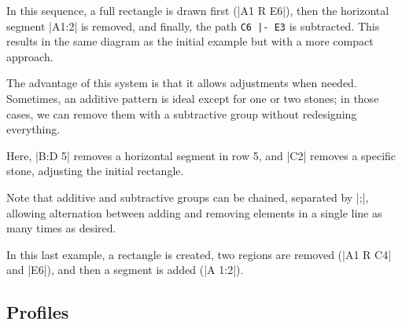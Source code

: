 \begin{goban}[9, stone = {radius = 4pt}, mark = {line = {color = red}}]
\begin{codeexample}[width=6cm]
	\begin{goban}[label = {at = all}, partial = A1:E6]
	\end{goban}
\end{codeexample}

In this sequence, a full rectangle is drawn first (|A1 R E6|), then the horizontal segment |A1:2| is removed, and finally, the path \verb+C6 |- E3+ is subtracted. This results in the same diagram as the initial example but with a more compact approach.

The advantage of this system is that it allows adjustments when needed. Sometimes, an additive pattern is ideal except for one or two stones; in those cases, we can remove them with a subtractive group without redesigning everything.

\begin{codeexample}[width=6cm]
	\begin{goban}[label = {at = all}]
	\end{goban}
\end{codeexample}

Here, |B:D 5| removes a horizontal segment in row 5, and |C2| removes a specific stone, adjusting the initial rectangle.

Note that additive and subtractive groups can be chained, separated by |;|, allowing alternation between adding and removing elements in a single line as many times as desired.

\begin{codeexample}[width=6cm]
	\begin{goban}[label = {at = all}, partial = A1:E6]
	\end{goban}
	
	\begin{goban}[label = {at = all}, partial = A1:E6]
	\end{goban}
	
	\begin{goban}[label = {at = all}, partial = A1:E6]
	\end{goban}
\end{codeexample}

In this last example, a rectangle is created, two regions are removed (|A1 R C4| and |E6|), and then a segment is added (|A 1:2|).

\subsection{Profiles}
\label{subsec:profiles}


\end{goban}
